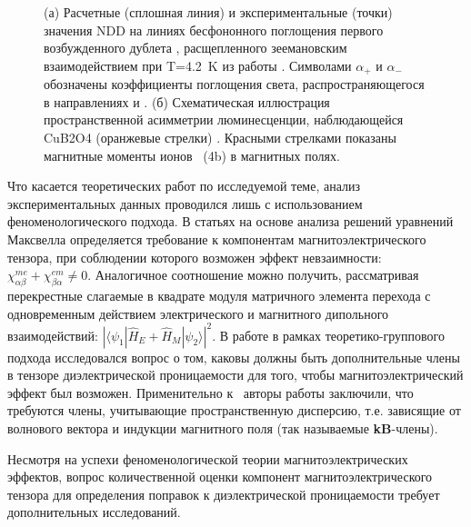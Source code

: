 \begin{figure}[ht]
	\caption{(а) Расчетные (сплошная линия) и экспериментальные (точки) значения NDD на линиях бесфононного поглощения первого возбужденного дублета \cbo, расщепленного зеемановским взаимодействием при T=\SI{4.2}{\kelvin} из работы \cite{Toyoda2015}. Символами \(\alpha_+\) и \(\alpha_-\) обозначены коэффициенты поглощения света, распространяющегося в направлениях  и . (б) Схематическая иллюстрация пространственной асимметрии люминесценции, наблюдающейся CuB2O4 (оранжевые стрелки) \cite{Toyoda2016}. Красными стрелками показаны магнитные моменты ионов \cu\ (4b) в магнитных полях.}
	\label{fig:ndd}
\end{figure}

Что касается теоретических работ по исследуемой теме, анализ экспериментальных данных проводился лишь с использованием феноменологического подхода. В статьях \cite{Bordacs2012, Kezsmarki2014, Miyahara2014} на основе анализа решений уравнений Максвелла определяется требование к компонентам магнитоэлектрического тензора, при соблюдении которого возможен эффект невзаимности: \(\chi^{me}_{\alpha\beta}+\chi^{em}_{\beta\alpha}\neq0\). Аналогичное соотношение можно получить, рассматривая перекрестные слагаемые в квадрате модуля матричного элемента перехода с одновременным действием электрического и магнитного дипольного взаимодействий: \( \left| \langle \psi_1 | \hat{H}_E + \hat{H}_M | \psi_2 \rangle \right| ^2\). В работе \cite{Nikitchenko2021} в рамках теоретико-группового подхода исследовался вопрос о том, каковы должны быть дополнительные члены в тензоре диэлектрической проницаемости для того, чтобы магнитоэлектрический эффект был возможен. Применительно к \cbo\ авторы работы \cite{Nikitchenko2021} заключили, что требуются члены, учитывающие пространственную дисперсию, т.е. зависящие от волнового вектора и индукции магнитного поля (так называемые \textbf{kB}-члены). 

Несмотря на успехи феноменологической теории магнитоэлектрических эффектов, вопрос количественной оценки компонент магнитоэлектрического тензора для определения поправок к диэлектрической проницаемости требует дополнительных исследований.

\FloatBarrier
